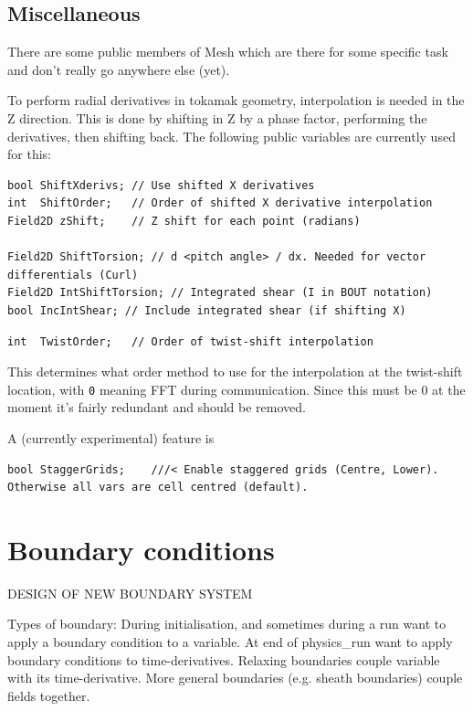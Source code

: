 \documentclass[12pt]{article}
\newcommand{\code}[1]{\texttt{#1}}
\begin{document}
\subsection{Miscellaneous}

There are some public members of Mesh which are there for some specific
task and don't really go anywhere else (yet). 

To perform radial derivatives in tokamak geometry, interpolation is needed
in the Z direction. This is done by shifting in Z by a phase factor, performing
the derivatives, then shifting back. The following public variables are currently
used for this:
\begin{lstlisting}
bool ShiftXderivs; // Use shifted X derivatives
int  ShiftOrder;   // Order of shifted X derivative interpolation
Field2D zShift;    // Z shift for each point (radians)
  
Field2D ShiftTorsion; // d <pitch angle> / dx. Needed for vector differentials (Curl)
Field2D IntShiftTorsion; // Integrated shear (I in BOUT notation)
bool IncIntShear; // Include integrated shear (if shifting X)
\end{lstlisting}

\begin{lstlisting}
int  TwistOrder;   // Order of twist-shift interpolation
\end{lstlisting}
This determines what order method to use for the interpolation at the twist-shift
location, with \code{0} meaning FFT during communication. Since this must be 0 at the moment
it's fairly redundant and should be removed.

A (currently experimental) feature is 
\begin{lstlisting}
bool StaggerGrids;    ///< Enable staggered grids (Centre, Lower). Otherwise all vars are cell centred (default).
\end{lstlisting}

\section{Boundary conditions}
\label{sec:boundaries}

DESIGN OF NEW BOUNDARY SYSTEM

Types of boundary: During initialisation, and sometimes during a run
want to apply a boundary condition to a variable. At end of physics\_run
want to apply boundary conditions to time-derivatives. Relaxing boundaries
couple variable with its time-derivative. More general boundaries (e.g.
sheath boundaries) couple fields together.
\end{document}
